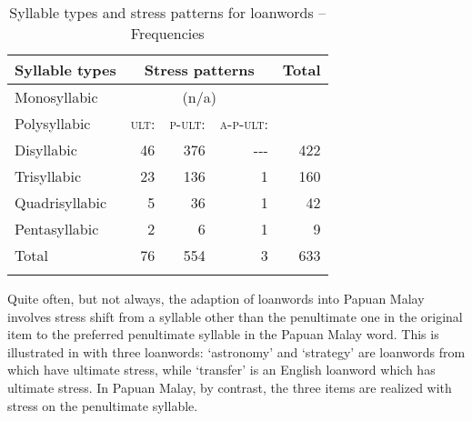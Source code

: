 \begin{table}
\caption{Syllable types and stress patterns for loanwords – Frequencies\label{Table_2.61}}

\begin{tabular}{lrrrr}
\lsptoprule 
 Syllable types & \multicolumn{3}{c}{ Stress patterns} &  Total\\

\midrule

Monosyllabic & \multicolumn{3}{c}{ (n/a)} & \\

Polysyllabic & \textsc{ult}: & \textsc{p-ult}: & \textsc{a-p-ult}: & \\

Disyllabic &  46 &  376 &  {}-{}-{}- &  422\\

Trisyllabic &  23 &  136 &  1 &  160\\

Quadrisyllabic &  5 &  36 &  1 &  42\\

Pentasyllabic &  2 &  6 &  1 &  9\\
\midrule
 Total &  76 &  554 &  3 &  633\\


\lspbottomrule
\end{tabular}
\end{table}

Quite often, but not always, the adaption of loanwords into Papuan Malay involves stress shift from a syllable other than the penultimate one in the original item to the preferred penultimate syllable in the Papuan Malay word. This is illustrated in  with three loanwords:  ‘astronomy’ and  ‘strategy’ are loanwords from  which have ultimate stress, while  ‘transfer’ is an English loanword which has ultimate stress. In Papuan Malay, by contrast, the three items are realized with stress on the penultimate syllable.

